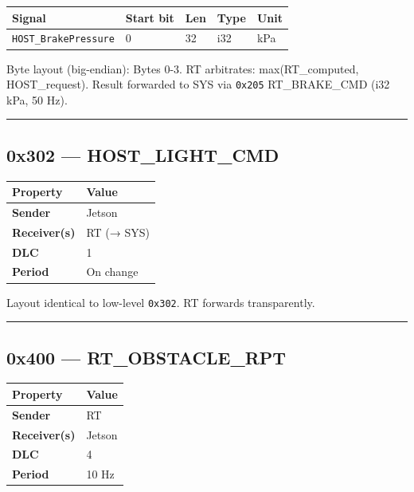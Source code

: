 \begin{longtable}[]{@{}lllll@{}}
\toprule\noalign{}
Signal & Start bit & Len & Type & Unit \\
\midrule\noalign{}
\endhead
\bottomrule\noalign{}
\endlastfoot
\texttt{HOST\_BrakePressure} & 0 & 32 & i32 & kPa \\
\end{longtable}

Byte layout (big-endian): Bytes 0-3. RT arbitrates: max(RT\_computed,
HOST\_request). Result forwarded to SYS via \texttt{0x205} RT\_BRAKE\_CMD (i32
kPa, 50 Hz).

\begin{center}\rule{0.5\linewidth}{0.5pt}\end{center}

\subsection{0x302 --- HOST\_LIGHT\_CMD}\label{x302-host_light_cmd}

\begin{longtable}[]{@{}ll@{}}
\toprule\noalign{}
Property & Value \\
\midrule\noalign{}
\endhead
\bottomrule\noalign{}
\endlastfoot
\textbf{Sender} & Jetson \\
\textbf{Receiver(s)} & RT (→ SYS) \\
\textbf{DLC} & 1 \\
\textbf{Period} & On change \\
\end{longtable}

Layout identical to low-level \texttt{0x302}. RT forwards transparently.

\begin{center}\rule{0.5\linewidth}{0.5pt}\end{center}

\subsection{0x400 --- RT\_OBSTACLE\_RPT}\label{x400-rt_obstacle_rpt}

\begin{longtable}[]{@{}ll@{}}
\toprule\noalign{}
Property & Value \\
\midrule\noalign{}
\endhead
\bottomrule\noalign{}
\endlastfoot
\textbf{Sender} & RT \\
\textbf{Receiver(s)} & Jetson \\
\textbf{DLC} & 4 \\
\textbf{Period} & 10 Hz \\
\end{longtable}

